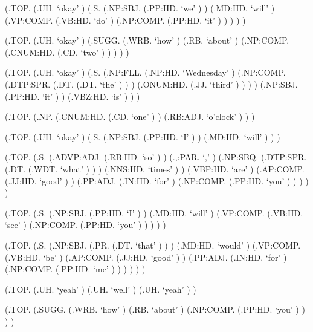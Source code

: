 \documentclass[10pt]{article}
\begin{document}
\begin{parsetree}  (.TOP. (.UH. `okay' ) (.S. (.NP:SBJ. (.PP:HD. `we' ) ) (.MD:HD. `will' ) (.VP:COMP. (.VB:HD. `do' ) (.NP:COMP. (.PP:HD. `it' ) ) ) ) ) \end{parsetree}

\begin{parsetree}  (.TOP. (.UH. `okay' ) (.SUGG. (.WRB. `how' ) (.RB. `about' ) (.NP:COMP. (.CNUM:HD. (.CD. `two' ) ) ) ) ) \end{parsetree}

\begin{parsetree}  (.TOP. (.UH. `okay' ) (.S. (.NP:FLL. (.NP:HD. `Wednesday' ) (.NP:COMP. (.DTP:SPR. (.DT. (.DT. `the' ) ) ) (.ONUM:HD. (.JJ. `third' ) ) ) ) (.NP:SBJ. (.PP:HD. `it' ) ) (.VBZ:HD. `is' ) ) ) \end{parsetree}

\begin{parsetree}  (.TOP. (.NP. (.CNUM:HD. (.CD. `one' ) ) (.RB:ADJ. `o'clock' ) ) ) \end{parsetree}

\begin{parsetree}  (.TOP. (.UH. `okay' ) (.S. (.NP:SBJ. (.PP:HD. `I' ) ) (.MD:HD. `will' ) ) ) \end{parsetree}

\begin{parsetree}  (.TOP. (.S. (.ADVP:ADJ. (.RB:HD. `so' ) ) (.,:PAR. `,' ) (.NP:SBQ. (.DTP:SPR. (.DT. (.WDT. `what' ) ) ) (.NNS:HD. `times' ) ) (.VBP:HD. `are' ) (.AP:COMP. (.JJ:HD. `good' ) ) (.PP:ADJ. (.IN:HD. `for' ) (.NP:COMP. (.PP:HD. `you' ) ) ) ) ) \end{parsetree}

\begin{parsetree}  (.TOP. (.S. (.NP:SBJ. (.PP:HD. `I' ) ) (.MD:HD. `will' ) (.VP:COMP. (.VB:HD. `see' ) (.NP:COMP. (.PP:HD. `you' ) ) ) ) ) \end{parsetree}

\begin{parsetree}  (.TOP. (.S. (.NP:SBJ. (.PR. (.DT. `that' ) ) ) (.MD:HD. `would' ) (.VP:COMP. (.VB:HD. `be' ) (.AP:COMP. (.JJ:HD. `good' ) ) (.PP:ADJ. (.IN:HD. `for' ) (.NP:COMP. (.PP:HD. `me' ) ) ) ) ) ) \end{parsetree}

\begin{parsetree}  (.TOP. (.UH. `yeah' ) (.UH. `well' ) (.UH. `yeah' ) ) \end{parsetree}

\begin{parsetree}  (.TOP. (.SUGG. (.WRB. `how' ) (.RB. `about' ) (.NP:COMP. (.PP:HD. `you' ) ) ) ) \end{parsetree}
\end{document}
